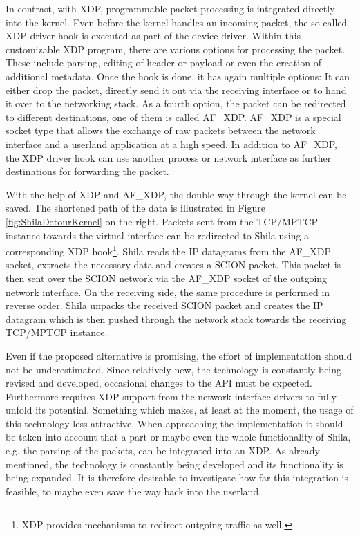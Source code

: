 In contrast, with XDP, programmable packet processing is integrated directly into the kernel. Even before the kernel handles an incoming packet, the so-called XDP driver hook is executed as part of the device driver. Within this customizable XDP program, there are various options for processing the packet. These include parsing, editing of header or payload or even the creation of additional metadata. Once the hook is done, it has again multiple options: It can either drop the packet, directly send it out via the receiving interface or to hand it over to the networking stack. As a fourth option, the packet can be redirected to different destinations, one of them is called AF\_XDP. AF\_XDP \cite{AFXDPPaper, AFXDPWeb,AFXDPWeb2} is a special socket type that allows the exchange of raw packets between the network interface and a userland application at a high speed. In addition to AF\_XDP, the XDP driver hook can use another process or network interface as further destinations for forwarding the packet.

With the help of XDP and AF\_XDP, the double way through the kernel can be saved. The shortened path of the data is illustrated in Figure \ref{fig:ShilaDetourKernel} on the right.  Packets sent from the TCP/MPTCP instance towards the virtual interface can be redirected to Shila using a corresponding XDP hook\footnote{XDP provides mechanisms to redirect outgoing traffic as well.}. Shila reads the IP datagrams from the AF\_XDP socket, extracts the necessary data and creates a SCION packet. This packet is then sent over the SCION network via the AF\_XDP socket of the outgoing network interface. On the receiving side, the same procedure is performed in reverse order. Shila unpacks the received SCION packet and creates the IP datagram which is then pushed through the network stack towards the receiving TCP/MPTCP instance.

Even if the proposed alternative is promising, the effort of implementation should not be underestimated. Since relatively new, the technology is constantly being revised and developed, occasional changes to the API must be expected. Furthermore requires XDP support from the network interface drivers to fully unfold its potential. Something which makes, at least at the moment, the usage of this technology less attractive. When approaching the implementation it should be taken into account that a part or maybe even the whole functionality of Shila, e.g. the parsing of the packets, can be integrated into an XDP. As already mentioned, the technology is constantly being developed and its functionality is being expanded. It is therefore desirable to investigate how far this integration is feasible, to maybe even save the way back into the userland.  
	
